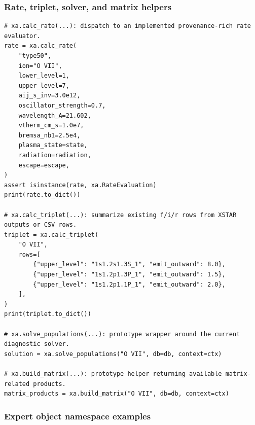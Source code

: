 \documentclass[11pt]{article}
\begin{document}
\subsubsection{Rate, triplet, solver, and matrix helpers}

\begin{lstlisting}[style=ctpython]
# xa.calc_rate(...): dispatch to an implemented provenance-rich rate evaluator.
rate = xa.calc_rate(
    "type50",
    ion="O VII",
    lower_level=1,
    upper_level=7,
    aij_s_inv=3.0e12,
    oscillator_strength=0.7,
    wavelength_A=21.602,
    vtherm_cm_s=1.0e7,
    bremsa_nb1=2.5e4,
    plasma_state=state,
    radiation=radiation,
    escape=escape,
)
assert isinstance(rate, xa.RateEvaluation)
print(rate.to_dict())

# xa.calc_triplet(...): summarize existing f/i/r rows from XSTAR outputs or CSV rows.
triplet = xa.calc_triplet(
    "O VII",
    rows=[
        {"upper_level": "1s1.2s1.3S_1", "emit_outward": 8.0},
        {"upper_level": "1s1.2p1.3P_1", "emit_outward": 1.5},
        {"upper_level": "1s1.2p1.1P_1", "emit_outward": 2.0},
    ],
)
print(triplet.to_dict())

# xa.solve_populations(...): prototype wrapper around the current diagnostic solver.
solution = xa.solve_populations("O VII", db=db, context=ctx)

# xa.build_matrix(...): prototype helper returning available matrix-related products.
matrix_products = xa.build_matrix("O VII", db=db, context=ctx)
\end{lstlisting}

\subsubsection{Expert object namespace examples}
\end{document}
